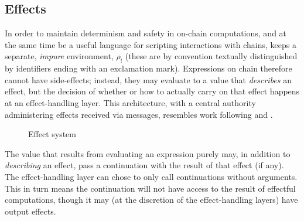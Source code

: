 \subsection{Effects} In order to maintain determinism and safety in on-chain
computations, and at the same time be a useful language for scripting
interactions with chains, \rad keeps a separate, \emph{impure} environment,
$\rho_{!}$ (these are by convention textually distinguished by identifiers
ending with an exclamation mark). Expressions on chain therefore cannot have
side-effects; instead, they may evaluate to a value that \emph{describes} an effect,
but the decision of whether or how to actually carry on that effect happens at an
effect-handling layer. This architecture, with a central authority
administering effects received via messages, resembles work following
\cite{Cartwright1994} and \cite{Bauer2003}.


\begin{figure}[H]
\caption{Effect system}
\label{f:effects}
\end{figure}

The value that results from evaluating an expression purely may, in addition to
\emph{describing} an effect, pass a continuation with the result of that
effect (if any). The effect-handling layer can chose to only call continuations
without arguments. This in turn means the continuation will not have access to
the result of effectful computations, though it may (at the discretion of the
effect-handling layers) have output effects.

